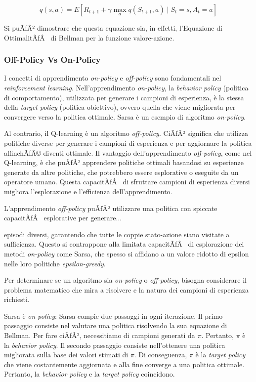 ﻿\documentclass[11pt, a4paper]{report}
\begin{document}
\[
q(s, a) = E[R_{t+1} + \gamma \max_a q(S_{t+1}, a) \mid S_t = s, A_t = a] \tag{5.11}
\]

Si puÃƒÂ² dimostrare che questa equazione sia, in effetti, l'Equazione di OttimalitÃƒÂ  di Bellman per la funzione valore-azione.

\subsubsection{Off-Policy Vs On-Policy}

I concetti di apprendimento \emph{on-policy} e \emph{off-policy} sono fondamentali nel \emph{reinforcement learning}. Nell'apprendimento \emph{on-policy}, la \emph{behavior policy} (politica di comportamento), utilizzata per generare i campioni di esperienza, è la stessa della \emph{target policy} (politica obiettivo), ovvero quella che viene migliorata per convergere verso la politica ottimale. Sarsa è un esempio di algoritmo \emph{on-policy}.

Al contrario, il Q-learning è un algoritmo \emph{off-policy}. CiÃƒÂ² significa che utilizza politiche diverse per generare i campioni di esperienza e per aggiornare la politica affinchÃƒÂ© diventi ottimale. Il vantaggio dell'apprendimento \emph{off-policy}, come nel Q-learning, è che puÃƒÂ² apprendere politiche ottimali basandosi su esperienze generate da altre politiche, che potrebbero essere esplorative o eseguite da un operatore umano. Questa capacitÃƒÂ  di sfruttare campioni di esperienza diversi migliora l'esplorazione e l'efficienza dell'apprendimento.

L'apprendimento \emph{off-policy} puÃƒÂ² utilizzare una politica con spiccate capacitÃƒÂ  esplorative per generare...

\newpage

episodi diversi, garantendo che tutte le coppie stato-azione siano visitate a sufficienza. Questo si contrappone alla limitata capacitÃƒÂ  di esplorazione dei metodi \emph{on-policy} come Sarsa, che spesso si affidano a un valore ridotto di epsilon nelle loro politiche \emph{epsilon-greedy}.

Per determinare se un algoritmo sia \emph{on-policy} o \emph{off-policy}, bisogna considerare il problema matematico che mira a risolvere e la natura dei campioni di esperienza richiesti.

Sarsa è \emph{on-policy}: Sarsa compie due passaggi in ogni iterazione. Il primo passaggio consiste nel valutare una politica risolvendo la sua equazione di Bellman. Per fare ciÃƒÂ², necessitiamo di campioni generati da $\pi$. Pertanto, $\pi$ è la \emph{behavior policy}. Il secondo passaggio consiste nell'ottenere una politica migliorata sulla base dei valori stimati di $\pi$. Di conseguenza, $\pi$ è la \emph{target policy} che viene costantemente aggiornata e alla fine converge a una politica ottimale. Pertanto, la \emph{behavior policy} e la \emph{target policy} coincidono.
\end{document}
